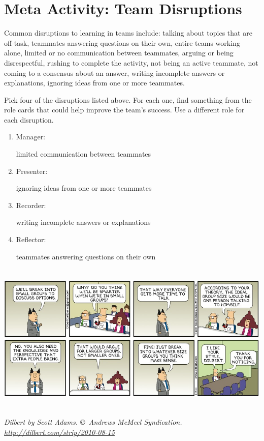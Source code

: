 \section*{Meta Activity: Team Disruptions}

Common disruptions to learning in teams include:
  talking about topics that are off-task,
  teammates answering questions on their own,
  entire teams working alone,
  limited or no communication between teammates,
  arguing or being disrespectful,
  rushing to complete the activity,
  not being an active teammate,
  not coming to a consensus about an answer,
  writing incomplete answers or explanations,
  ignoring ideas from one or more teammates.




\Q Pick four of the disruptions listed above.
For each one, find something from the role cards that could help improve the team's success.
Use a different role for each disruption.

\begin{enumerate}[itemsep=1ex]

\item Manager:

\begin{answer}[2em]
limited communication between teammates
\end{answer}

\item Presenter:

\begin{answer}[2em]
ignoring ideas from one or more teammates
\end{answer}

\item Recorder:

\begin{answer}[2em]
writing incomplete answers or explanations
\end{answer}

\item Reflector:

\begin{answer}[2em]
teammates answering questions on their own
\end{answer}

\end{enumerate}

\begin{center}
\includegraphics[height=2.85in]{disrupt1.png}
\par \itshape \footnotesize
Dilbert by Scott Adams.
\copyright\ Andrews McMeel Syndication.
\url{http://dilbert.com/strip/2010-08-15}
\end{center}

